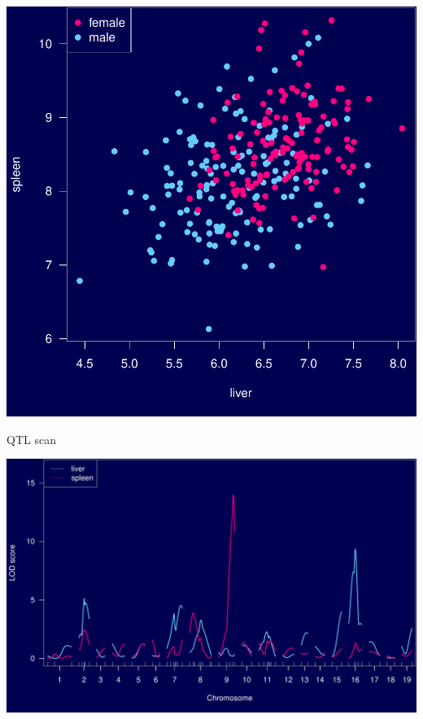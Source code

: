 \documentclass[12pt]{article}
\newcommand{\headsize}{\fontsize{35}{35} \selectfont}
\begin{document}
\centerline{\includegraphics{Figs/iron_scatter.pdf}}

\newpage

\headsize \color{myyellow}
\hfill \begin{minipage}{5.75in}
\centering
QTL scan
\end{minipage}

\vspace{15mm}

\centerline{\includegraphics{Figs/iron_lod.pdf}}


\newpage

\addtocounter{page}{-1}
\end{document}
